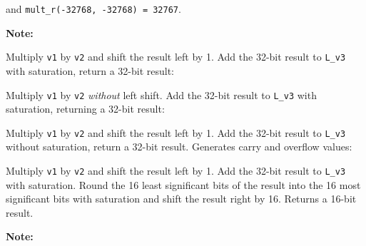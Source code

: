 
and {\tt mult\_r(-32768, -32768) = 32767}.

\textbf{Note:} \hfill {}


Multiply {\tt v1} by {\tt v2} and shift the result left by 1. Add the
32-bit result to {\tt L\_v3} with saturation, return a 32-bit result:



Multiply {\tt v1} by {\tt v2} {\em without} left shift. Add the 32-bit
result to {\tt L\_v3} with saturation, returning a 32-bit result:



Multiply {\tt v1} by {\tt v2} and shift the result left by 1. Add the
32-bit result to {\tt L\_v3} without saturation, return a 32-bit
result. Generates carry and overflow values:



Multiply {\tt v1} by {\tt v2} and shift the result left by 1. Add
the 32-bit result to {\tt L\_v3} with saturation. Round the 16
least significant bits of the result into the 16 most significant
bits with saturation and shift the result right by 16. Returns a
16-bit result.


\textbf{Note:} \hfill {}


